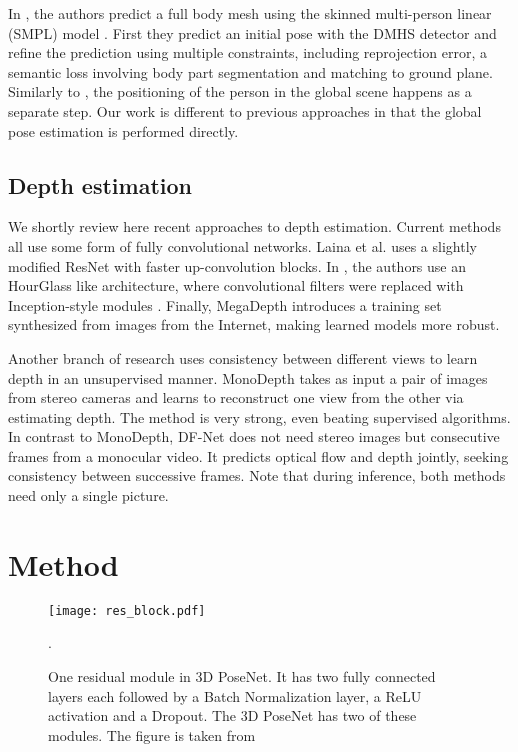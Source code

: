 \documentclass[conference]{IEEEtran}
\begin{document}
In \cite{zanfir2018smpl3dpose}, the authors predict a full body mesh using the skinned multi-person linear (SMPL) model \cite{smpl2015}. First they predict an initial pose with the DMHS detector \cite{dmhs2017} and refine the prediction using multiple constraints, including reprojection error, a semantic loss involving body part segmentation and matching to ground plane. Similarly to \cite{mehta}, the positioning of the person in the global scene happens as a separate step. Our work is different to previous approaches in that the global pose estimation is performed directly.

\subsection{Depth estimation} We shortly review here recent approaches to depth estimation. Current methods all use some form of fully convolutional networks. Laina et al. \cite{fcrnd} uses a slightly modified ResNet with faster up-convolution blocks. In \cite{diw2016}, the authors use an HourGlass \cite{stacked_hourglass} like architecture, where convolutional filters were replaced with Inception-style modules \cite{inceptionnet}. Finally, MegaDepth \cite{megadepth2018} introduces a training set synthesized from images from the Internet, making learned models more robust.

Another branch of research uses consistency between different views to learn depth in an unsupervised manner. \mbox{MonoDepth} \cite{monodepth2017} takes as input a pair of images from stereo cameras and learns to reconstruct one view from the other via estimating depth. The method is very strong, even beating supervised algorithms.  In contrast to MonoDepth, DF-Net \cite{zou2018dfnet} does not need stereo images but consecutive frames from a monocular video. It predicts  optical flow and depth jointly, seeking consistency between successive frames. Note that during inference, both methods need only a single picture.

\section{Method}\label{sec:methods}

\begin{figure*}
\centering
\texttt{[image: res\_block.pdf]}
\caption{One residual module in 3D PoseNet. It has two fully connected layers each followed by a Batch Normalization layer, a ReLU activation and a Dropout. The 3D PoseNet has two of these modules. The figure is taken from \cite{veges2018siamese}}.
\label{fig:res-block}
\end{figure*}
\end{document}
